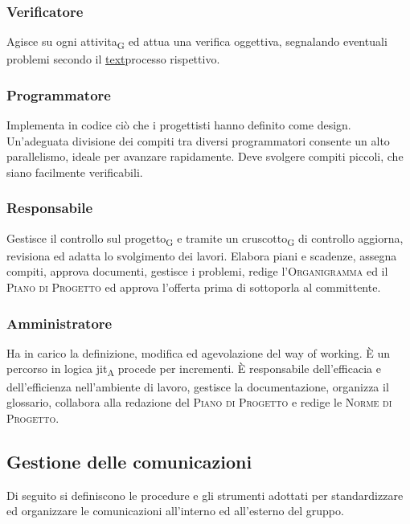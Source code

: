     \subsubsection{Verificatore}
    Agisce su ogni attivita\textsubscript{G} ed attua una verifica oggettiva, segnalando eventuali problemi secondo il \hyperref[label]{text}{processo rispettivo}.
    \subsubsection{Programmatore}
    Implementa in codice ciò che i progettisti hanno definito come design. Un'adeguata divisione dei compiti tra diversi programmatori consente un alto parallelismo, ideale per avanzare rapidamente. Deve svolgere compiti piccoli, che siano facilmente verificabili.
    \subsubsection{Responsabile}
    Gestisce il controllo sul progetto\textsubscript{G} e tramite un cruscotto\textsubscript{G} di controllo aggiorna, revisiona ed adatta lo svolgimento dei lavori. Elabora piani e scadenze, assegna compiti, approva documenti, gestisce i problemi, redige l'\textsc{Organigramma} ed il \textsc{Piano di Progetto} ed approva l'offerta prima di sottoporla al committente.
    \subsubsection{Amministratore}
    Ha in carico la definizione, modifica ed agevolazione del way of working. È un percorso in logica jit\textsubscript{A} procede per incrementi. È responsabile dell'efficacia e dell'efficienza nell'ambiente di lavoro, gestisce la documentazione, organizza il glossario, collabora alla redazione del \textsc{Piano di Progetto} e redige le \textsc{Norme di Progetto}.

\subsection{Gestione delle comunicazioni}
    Di seguito si definiscono le procedure e gli strumenti adottati per standardizzare ed organizzare le comunicazioni all'interno ed all'esterno del gruppo.
